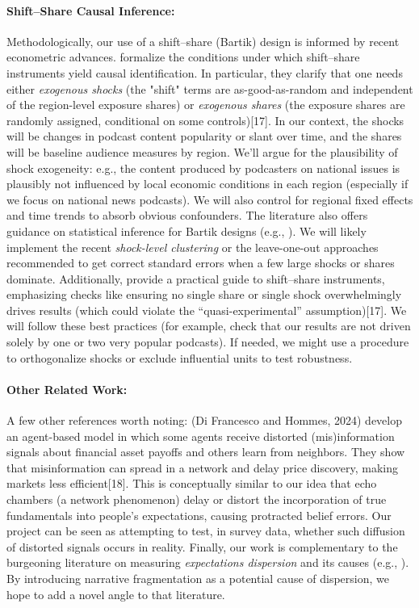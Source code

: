 \documentclass[12pt]{article}
\begin{document}
\paragraph{Shift--Share Causal Inference:} Methodologically, our use of a shift--share (Bartik) design is informed by recent econometric advances. \citet{Borusyak2022shiftshare} formalize the conditions under which shift--share instruments yield causal identification. In particular, they clarify that one needs either \emph{exogenous shocks} (the "shift" terms are as-good-as-random and independent of the region-level exposure shares) or \emph{exogenous shares} (the exposure shares are randomly assigned, conditional on some controls)[17]. In our context, the shocks will be changes in podcast content popularity or slant over time, and the shares will be baseline audience measures by region. We'll argue for the plausibility of shock exogeneity: e.g., the content produced by podcasters on national issues is plausibly not influenced by local economic conditions in each region (especially if we focus on national news podcasts). We will also control for regional fixed effects and time trends to absorb obvious confounders. The literature also offers guidance on statistical inference for Bartik designs (e.g., \citealp{Adao2019}). We will likely implement the recent \textit{shock-level clustering} or the leave-one-out approaches recommended to get correct standard errors when a few large shocks or shares dominate.
Additionally, \citet{BorusyakHullJaravel2023JEP} provide a practical guide to shift--share instruments, emphasizing checks like ensuring no single share or single shock overwhelmingly drives results (which could violate the ``quasi-experimental'' assumption)[17]. We will follow these best practices (for example, check that our results are not driven solely by one or two very popular podcasts). If needed, we might use a procedure to orthogonalize shocks or exclude influential units to test robustness.

\paragraph{Other Related Work:} A few other references worth noting: \citet{DiFrancesco2024ABM} (Di Francesco and Hommes, 2024) develop an agent-based model in which some agents receive distorted (mis)information signals about financial asset payoffs and others learn from neighbors. They show that misinformation can spread in a network and delay price discovery, making markets less efficient[18]. This is conceptually similar to our idea that echo chambers (a network phenomenon) delay or distort the incorporation of true fundamentals into people's expectations, causing protracted belief errors. Our project can be seen as attempting to test, in survey data, whether such diffusion of distorted signals occurs in reality. Finally, our work is complementary to the burgeoning literature on measuring \textit{expectations dispersion} and its causes (e.g., \citealp{MankiwReis2002, Coibion2012}). By introducing narrative fragmentation as a potential cause of dispersion, we hope to add a novel angle to that literature.
\end{document}
